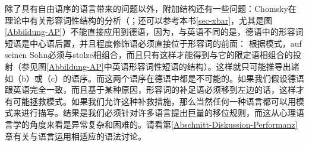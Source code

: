 除了具有自由语序的语言带来的问题以外，附加结构还有一些问题：Chomsky在\xbarc 理论中有关形容词性结构的分析（\citealp[]{Chomsky70a}；还可以参考本书\ref{sec-xbar}，尤其是图\vref{Abbildung-AP}）不能直接应用到德语，因为，与英语不同的是，德语中的形容词短语是中心语后置，并且程度修饰语必须直接位于形容词的前面：
\eal
{}
\zl
根据\xbarc 模式，auf seinen Sohn必须与stolze相组合，而且只有这样才能得到与它的限定语相组合的\abarc 投射（参见图\vref{Abbildung-AP}中英语形容词性短语的结构）。这样就只可能推导出诸如（b）或（c）的语序。而这两个语序在德语中都是不可能的。如果我们假设德语跟英语完全一致，而且基于某种原因，形容词的补足语必须移到左边的话，这样才有可能拯救\xbarc 模式。如果我们允许这种补救措施，那么当然任何一种语言都可以用\xbarc 模式来进行描写。结果是我们必须针对许多语言提出巨量的移位规则，而这从心理语言学的角度来看是异常复杂和困难的。请看第\ref{Abschnitt-Diskussion-Performanz}章有关与语言运用相适应的语法讨论。 

